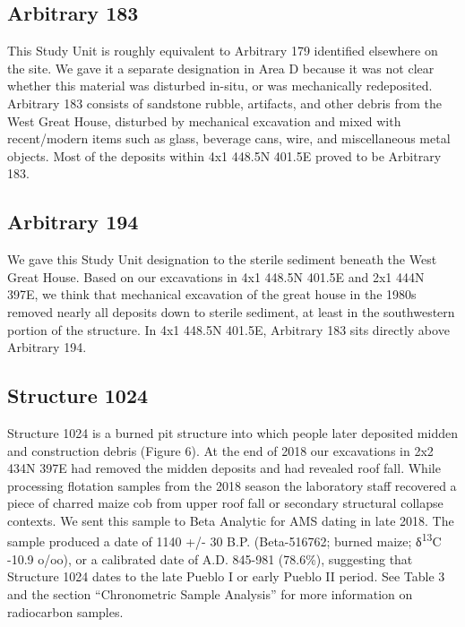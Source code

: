 \documentclass[
  12pt,
]{krantz}
\begin{document}
\hypertarget{arbitrary-183}{%
\subsection{Arbitrary 183}\label{arbitrary-183}}

This Study Unit is roughly equivalent to Arbitrary 179 identified
elsewhere on the site. We gave it a separate designation in Area D
because it was not clear whether this material was disturbed in-situ, or
was mechanically redeposited. Arbitrary 183 consists of sandstone
rubble, artifacts, and other debris from the West Great House, disturbed
by mechanical excavation and mixed with recent/modern items such as
glass, beverage cans, wire, and miscellaneous metal objects. Most of the
deposits within 4x1 448.5N 401.5E proved to be Arbitrary 183.

\hypertarget{arbitrary-194}{%
\subsection{Arbitrary 194}\label{arbitrary-194}}

We gave this Study Unit designation to the sterile sediment beneath the
West Great House. Based on our excavations in 4x1 448.5N 401.5E and 2x1
444N 397E, we think that mechanical excavation of the great house in the
1980s removed nearly all deposits down to sterile sediment, at least in
the southwestern portion of the structure. In 4x1 448.5N 401.5E,
Arbitrary 183 sits directly above Arbitrary 194.

\hypertarget{structure-1024}{%
\subsection{Structure 1024}\label{structure-1024}}

Structure 1024 is a burned pit structure into which people later
deposited midden and construction debris (Figure 6). At the end of 2018
our excavations in 2x2 434N 397E had removed the midden deposits and had
revealed roof fall. While processing flotation samples from the 2018
season the laboratory staff recovered a piece of charred maize cob from
upper roof fall or secondary structural collapse contexts. We sent this
sample to Beta Analytic for AMS dating in late 2018. The sample produced
a date of 1140 +/- 30 B.P. (Beta-516762; burned maize; δ\textsuperscript{13}C -10.9
o/oo), or a calibrated date of A.D. 845-981 (78.6\%), suggesting that
Structure 1024 dates to the late Pueblo I or early Pueblo II period. See
Table 3 and the section ``Chronometric Sample Analysis'' for more
information on radiocarbon samples.
\end{document}
